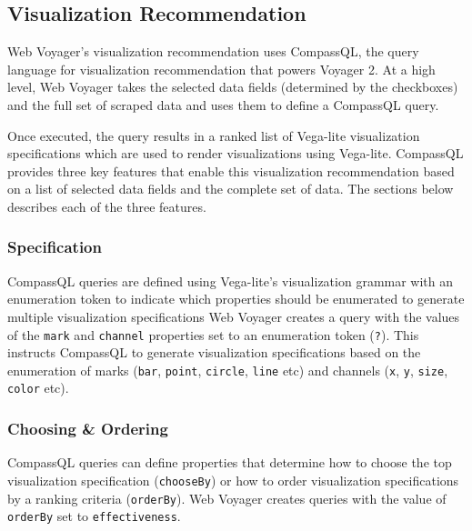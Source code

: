 \documentclass[sigconf,screen]{acmart}
\begin{document}
\hypertarget{visualization-recommendation}{%
\subsection{Visualization
Recommendation}\label{visualization-recommendation}}

Web Voyager's visualization recommendation uses CompassQL, the query
language for visualization recommendation that powers Voyager 2. At a
high level, Web Voyager takes the selected data fields (determined by
the checkboxes) and the full set of scraped data and uses them to define
a CompassQL query.

Once executed, the query results in a ranked list of Vega-lite
\citep{satyanarayan2017} visualization specifications which are used to
render visualizations using Vega-lite. CompassQL provides three key
features that enable this visualization recommendation based on a list
of selected data fields and the complete set of data. The sections below
describes each of the three features.

\hypertarget{specification}{%
\subsubsection{Specification}\label{specification}}

CompassQL queries are defined using Vega-lite's visualization grammar
with an enumeration token to indicate which properties should be
enumerated to generate multiple visualization specifications Web Voyager
creates a query with the values of the \texttt{mark} and
\texttt{channel} properties set to an enumeration token (\texttt{?}).
This instructs CompassQL to generate visualization specifications based
on the enumeration of marks (\texttt{bar}, \texttt{point},
\texttt{circle}, \texttt{line} etc) and channels (\texttt{x},
\texttt{y}, \texttt{size}, \texttt{color} etc).

\hypertarget{choosing-ordering}{%
\subsubsection{Choosing \& Ordering}\label{choosing-ordering}}

CompassQL queries can define properties that determine how to choose the
top visualization specification (\texttt{chooseBy}) or how to order
visualization specifications by a ranking criteria (\texttt{orderBy}).
Web Voyager creates queries with the value of \texttt{orderBy} set to
\texttt{effectiveness}.
\end{document}
